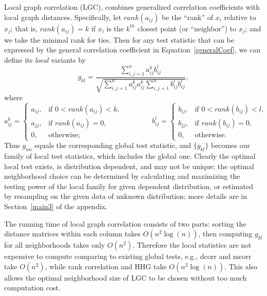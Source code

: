 \documentclass[11pt]{article}
\begin{document}
Local graph correlation (LGC), combines generalized correlation coefficients with local graph distances.  Specifically, let $rank(a_{ij})$  be the ``rank'' of $x_i$ relative to $x_j$; that is, $rank(a_{ij})=k$ if $x_i$ is the $k^{th}$ closest point (or ``neighbor'') to $x_j$; and we take the minimal rank for ties.  Then for any test statistic that can be expressed by the general correlation coefficient in Equation~\ref{generalCoef}, we can define its \emph{local} variants by
\begin{equation}
\label{localCoef}
g_{kl}=\frac{\sum_{i,j=1}^n a_{ij}^k b_{ij}^l}{\sqrt{\sum_{i,j=1}^n  a_{ij}^{k} a_{ij}^{k} \sum_{i,j=1}^n b_{ij}^{l} b_{ij}^{l}}},
\end{equation}
where
\begin{equation}
    a_{ij}^k=
    \begin{cases}
      a_{ij}, & \text{if } 0 < rank(a_{ij}) < k, \\
			a_{jj}, & \text{if } rank(a_{ij}) =0, \\
      0, & \text{otherwise};
    \end{cases} \qquad \qquad
    b_{ij}^l=
    \begin{cases}
      b_{ij}, & \text{if } 0 < rank(b_{ij}) < l, \\
			b_{jj}, & \text{if } rank(b_{ij}) =0, \\
      0, & \text{otherwise}.
    \end{cases}
\end{equation}
Thus $g_{nn}$ equals the corresponding global test statistic, and $\{g_{kl}\}$ becomes our family of local test statistics, which includes the global one. Clearly the optimal local test exists, is distribution dependent, and may not be unique; the optimal neighborhood choice can be determined by calculating and maximizing the testing power of the local family for given dependent distribution, or estimated by resampling on the given data of unknown distribution; more details are in Section~\ref{main3} of the appendix.

The running time of local graph correlation consists of two parts: sorting the distance matrices within each column takes $O(n^2\log(n))$, then computing $g_{kl}$ for all neighborhoods takes only $O(n^2)$. Therefore the local statistics are not expensive to compute comparing to existing global tests, e.g., dcorr and mcorr take $O(n^2)$, while rank correlation and HHG take $O(n^2\log(n))$. This also allows the optimal neighborhood size of LGC to be chosen without too much computation cost.
\end{document}
